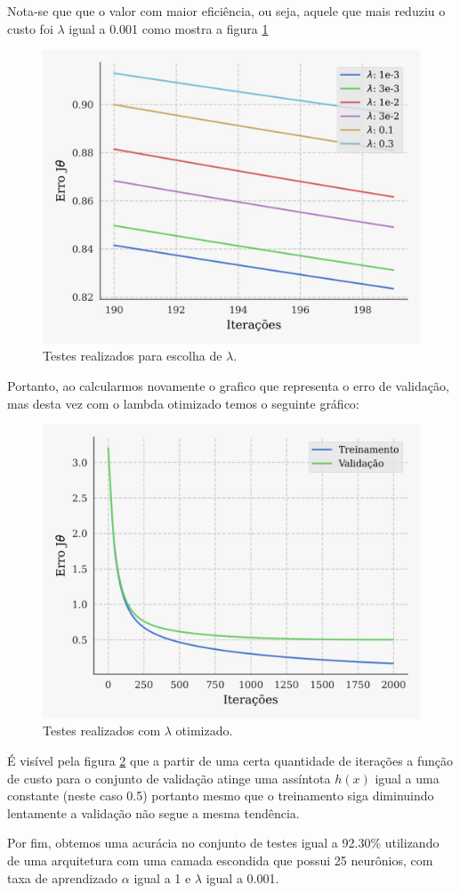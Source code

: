 Nota-se que que o valor com maior eficiência, ou seja, aquele que mais reduziu o custo foi $ \lambda $ igual a 0.001 como mostra a figura \ref{fig:zoom}
\begin{figure}[htb]
    \centering
    \includegraphics[width=0.64\linewidth]{graficos/zoom.png}
    \caption{Testes realizados para escolha de $\lambda$.}
    \label{fig:zoom}
\end{figure}
\newpage
Portanto, ao calcularmos novamente o grafico que representa o erro de validação, mas desta vez com o lambda otimizado temos o seguinte gráfico:
\begin{figure}[htb]
    \centering
    \includegraphics[width=0.8\linewidth]{graficos/erro_lambda_great.png}
    \caption{Testes realizados com $\lambda $ otimizado.}
    \label{fig:otimizado}
\end{figure}

É visível pela figura \ref{fig:otimizado} que a partir de uma certa 
quantidade de iterações a função de custo para o conjunto de validação 
atinge uma assíntota $h(x)$ igual a uma constante (neste caso 0.5) portanto mesmo que o treinamento 
siga diminuindo lentamente a validação não segue a mesma tendência.

Por fim, obtemos uma acurácia no conjunto de testes igual a 92.30\% utilizando de uma arquitetura com uma camada escondida que possui 25 neurônios, com taxa de aprendizado $\alpha$ igual a 1  e $\lambda$ igual a 0.001.

